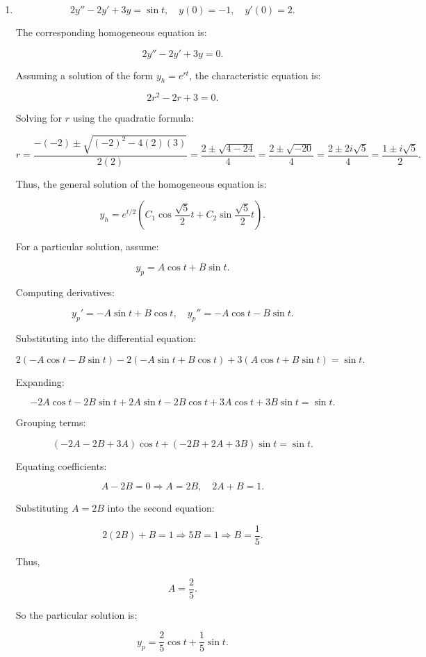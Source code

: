 \documentclass[12pt]{article}
\begin{document}
\begin{enumerate}
\item 
\[
2y'' - 2y' + 3y = \sin t, \quad y(0) = -1, \quad y'(0) = 2.
\]

The corresponding homogeneous equation is:

\[
2y'' - 2y' + 3y = 0.
\]

Assuming a solution of the form \( y_h = e^{rt} \), the characteristic equation is:

\[
2r^2 - 2r + 3 = 0.
\]

Solving for \( r \) using the quadratic formula:

\[
r = \frac{-(-2) \pm \sqrt{(-2)^2 - 4(2)(3)}}{2(2)}
= \frac{2 \pm \sqrt{4 - 24}}{4}
= \frac{2 \pm \sqrt{-20}}{4}
= \frac{2 \pm 2i\sqrt{5}}{4}
= \frac{1 \pm i\sqrt{5}}{2}.
\]

Thus, the general solution of the homogeneous equation is:

\[
y_h = e^{t/2} \left( C_1 \cos \frac{\sqrt{5}}{2}t + C_2 \sin \frac{\sqrt{5}}{2}t \right).
\]

For a particular solution, assume:

\[
y_p = A \cos t + B \sin t.
\]

Computing derivatives:

\[
y_p' = -A \sin t + B \cos t, \quad y_p'' = -A \cos t - B \sin t.
\]

Substituting into the differential equation:

\[
2(-A \cos t - B \sin t) - 2(-A \sin t + B \cos t) + 3(A \cos t + B \sin t) = \sin t.
\]

Expanding:

\[
-2A \cos t - 2B \sin t + 2A \sin t - 2B \cos t + 3A \cos t + 3B \sin t = \sin t.
\]

Grouping terms:

\[
(-2A - 2B + 3A) \cos t + (-2B + 2A + 3B) \sin t = \sin t.
\]

Equating coefficients:

\[
A - 2B = 0 \Rightarrow A = 2B, \quad 2A + B = 1.
\]

Substituting \( A = 2B \) into the second equation:

\[
2(2B) + B = 1 \Rightarrow 5B = 1 \Rightarrow B = \frac{1}{5}.
\]

Thus,

\[
A = \frac{2}{5}.
\]

So the particular solution is:

\[
y_p = \frac{2}{5} \cos t + \frac{1}{5} \sin t.
\]


\end{enumerate}
\end{document}
